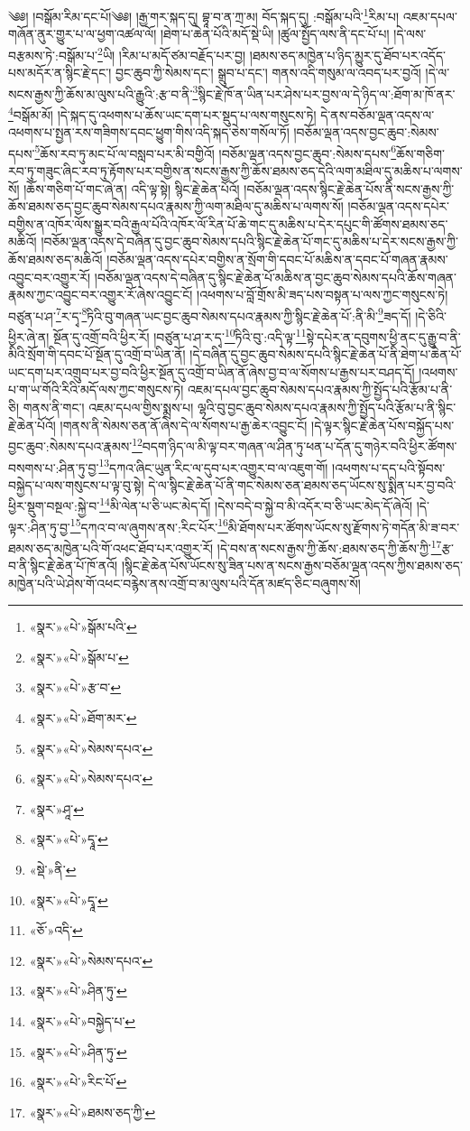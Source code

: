 ༄༅། །བསྒོམ་རིམ་དང་པོ།༄༅། །རྒྱ་གར་སྐད་དུ། བྷཱ་བ་ན་ཀྲ་མ། བོད་སྐད་དུ། :བསྒོམ་པའི་\footnote{«སྣར་»«པེ་»སྒོམ་པའི་}རིམ་པ། འཇམ་དཔལ་གཞོན་ནུར་གྱུར་པ་ལ་ཕྱག་འཚལ་ལོ། །ཐེག་པ་ཆེན་པོའི་མདོ་སྡེ་ཡི། །ཚུལ་སྤྱོད་ལས་ནི་དང་པོ་པ། །དེ་ལས་བརྩམས་ཏེ་:བསྒོམ་པ་\footnote{«སྣར་»«པེ་»སྒོམ་པ་}ཡི། །རིམ་པ་མདོ་ཙམ་བརྗོད་པར་བྱ། །ཐམས་ཅད་མཁྱེན་པ་ཉིད་མྱུར་དུ་ཐོབ་པར་འདོད་པས་མདོར་ན་སྙིང་རྗེ་དང་། བྱང་ཆུབ་ཀྱི་སེམས་དང་། སྒྲུབ་པ་དང་། གནས་འདི་གསུམ་ལ་འབད་པར་བྱའོ། །དེ་ལ་སངས་རྒྱས་ཀྱི་ཆོས་མ་ལུས་པའི་རྒྱུའི་:རྩ་བ་ནི་\footnote{«སྣར་»«པེ་»རྩ་བ་}སྙིང་རྗེ་ཁོ་ན་ཡིན་པར་ཤེས་པར་བྱས་ལ་དེ་ཉིད་ལ་:ཐོག་མ་ཁོ་ནར་\footnote{«སྣར་»«པེ་»ཐོག་མར་}བསྒོམ་མོ། །དེ་སྐད་དུ་འཕགས་པ་ཆོས་ཡང་དག་པར་སྡུད་པ་ལས་གསུངས་ཏེ། དེ་ནས་བཅོམ་ལྡན་འདས་ལ་འཕགས་པ་སྤྱན་རས་གཟིགས་དབང་ཕྱུག་གིས་འདི་སྐད་ཅེས་གསོལ་ཏོ། །བཅོམ་ལྡན་འདས་བྱང་ཆུབ་:སེམས་དཔས་\footnote{«སྣར་»«པེ་»སེམས་དཔའ་}ཆོས་རབ་ཏུ་མང་པོ་ལ་བསླབ་པར་མི་བགྱིའོ། །བཅོམ་ལྡན་འདས་བྱང་ཆུབ་:སེམས་དཔས་\footnote{«སྣར་»«པེ་»སེམས་དཔའ་}ཆོས་གཅིག་རབ་ཏུ་གཟུང་ཞིང་རབ་ཏུ་རྟོགས་པར་བགྱིས་ན་སངས་རྒྱས་ཀྱི་ཆོས་ཐམས་ཅད་དེའི་ལག་མཐིལ་དུ་མཆིས་པ་ལགས་སོ། །ཆོས་གཅིག་པོ་གང་ཞེ་ན། འདི་ལྟ་སྟེ། སྙིང་རྗེ་ཆེན་པོའོ། །བཅོམ་ལྡན་འདས་སྙིང་རྗེ་ཆེན་པོས་ནི་སངས་རྒྱས་ཀྱི་ཆོས་ཐམས་ཅད་བྱང་ཆུབ་སེམས་དཔའ་རྣམས་ཀྱི་ལག་མཐིལ་དུ་མཆིས་པ་ལགས་སོ། །བཅོམ་ལྡན་འདས་དཔེར་བགྱིས་ན་འཁོར་ལོས་སྒྱུར་བའི་རྒྱལ་པོའི་འཁོར་ལོ་རིན་པོ་ཆེ་གང་དུ་མཆིས་པ་དེར་དཔུང་གི་ཚོགས་ཐམས་ཅད་མཆིའོ། །བཅོམ་ལྡན་འདས་དེ་བཞིན་དུ་བྱང་ཆུབ་སེམས་དཔའི་སྙིང་རྗེ་ཆེན་པོ་གང་དུ་མཆིས་པ་དེར་སངས་རྒྱས་ཀྱི་ཆོས་ཐམས་ཅད་མཆིའོ། །བཅོམ་ལྡན་འདས་དཔེར་བགྱིས་ན་སྲོག་གི་དབང་པོ་མཆིས་ན་དབང་པོ་གཞན་རྣམས་འབྱུང་བར་འགྱུར་རོ། །བཅོམ་ལྡན་འདས་དེ་བཞིན་དུ་སྙིང་རྗེ་ཆེན་པོ་མཆིས་ན་བྱང་ཆུབ་སེམས་དཔའི་ཆོས་གཞན་རྣམས་ཀྱང་འབྱུང་བར་འགྱུར་རོ་ཞེས་འབྱུང་ངོ། །འཕགས་པ་བློ་གྲོས་མི་ཟད་པས་བསྟན་པ་ལས་ཀྱང་གསུངས་ཏེ། བཙུན་པ་ཤ་\footnote{«སྣར་»ཤཱ་}ར་དྭ་\footnote{«སྣར་»«པེ་»དྭཱ་}ཏིའི་བུ་གཞན་ཡང་བྱང་ཆུབ་སེམས་དཔའ་རྣམས་ཀྱི་སྙིང་རྗེ་ཆེན་པོ་:ནི་མི་\footnote{«སྡེ་»ནི་}ཟད་དོ། །དེ་ཅིའི་ཕྱིར་ཞེ་ན། སྔོན་དུ་འགྲོ་བའི་ཕྱིར་རོ། །བཙུན་པ་ཤ་ར་དྭ་\footnote{«སྣར་»«པེ་»དྭཱ་}ཏིའི་བུ་:འདི་ལྟ་\footnote{«ཅོ་»འདི་}སྟེ་དཔེར་ན་དབུགས་ཕྱི་ནང་དུ་རྒྱུ་བ་ནི་མིའི་སྲོག་གི་དབང་པོ་སྔོན་དུ་འགྲོ་བ་ཡིན་ནོ། །དེ་བཞིན་དུ་བྱང་ཆུབ་སེམས་དཔའི་སྙིང་རྗེ་ཆེན་པོ་ནི་ཐེག་པ་ཆེན་པོ་ཡང་དག་པར་འགྲུབ་པར་བྱ་བའི་ཕྱིར་སྔོན་དུ་འགྲོ་བ་ཡིན་ནོ་ཞེས་བྱ་བ་ལ་སོགས་པ་རྒྱས་པར་བཤད་དོ། །འཕགས་པ་ག་ཡ་གོའི་རིའི་མདོ་ལས་ཀྱང་གསུངས་ཏེ། འཇམ་དཔལ་བྱང་ཆུབ་སེམས་དཔའ་རྣམས་ཀྱི་སྤྱོད་པའི་རྩོམ་པ་ནི་ཅི། གནས་ནི་གང་། འཇམ་དཔལ་གྱིས་སྨྲས་པ། ལྷའི་བུ་བྱང་ཆུབ་སེམས་དཔའ་རྣམས་ཀྱི་སྤྱོད་པའི་རྩོམ་པ་ནི་སྙིང་རྗེ་ཆེན་པོའོ། །གནས་ནི་སེམས་ཅན་ནོ་ཞེས་དེ་ལ་སོགས་པ་རྒྱ་ཆེར་འབྱུང་ངོ། །དེ་ལྟར་སྙིང་རྗེ་ཆེན་པོས་བསྐྱོད་པས་བྱང་ཆུབ་:སེམས་དཔའ་རྣམས་\footnote{«སྣར་»«པེ་»སེམས་དཔའ་}བདག་ཉིད་ལ་མི་ལྟ་བར་གཞན་ལ་ཤིན་ཏུ་ཕན་པ་དོན་དུ་གཉེར་བའི་ཕྱིར་ཚོགས་བསགས་པ་:ཤིན་ཏུ་བྱ་\footnote{«སྣར་»«པེ་»ཤིན་ཏུ་}དཀའ་ཞིང་ཡུན་རིང་ལ་དུབ་པར་འགྱུར་བ་ལ་འཇུག་གོ། །འཕགས་པ་དད་པའི་སྟོབས་བསྐྱེད་པ་ལས་གསུངས་པ་ལྟ་བུ་སྟེ། དེ་ལ་སྙིང་རྗེ་ཆེན་པོ་ནི་གང་སེམས་ཅན་ཐམས་ཅད་ཡོངས་སུ་སྨིན་པར་བྱ་བའི་ཕྱིར་སྡུག་བསྔལ་:སྐྱེ་བ་\footnote{«སྣར་»«པེ་»བསྐྱེད་པ་}མི་ལེན་པ་ཅི་ཡང་མེད་དོ། །དེས་བདེ་བ་སྐྱེ་བ་མི་འདོར་བ་ཅི་ཡང་མེད་དོ་ཞེའོ། །དེ་ལྟར་:ཤིན་ཏུ་བྱ་\footnote{«སྣར་»«པེ་»ཤིན་ཏུ་}དཀའ་བ་ལ་ཞུགས་ནས་:རིང་པོར་\footnote{«སྣར་»«པེ་»རིང་པོ་}མི་ཐོགས་པར་ཚོགས་ཡོངས་སུ་རྫོགས་ཏེ་གདོན་མི་ཟ་བར་ཐམས་ཅད་མཁྱེན་པའི་གོ་འཕང་ཐོབ་པར་འགྱུར་རོ། །དེ་བས་ན་སངས་རྒྱས་ཀྱི་ཆོས་:ཐམས་ཅད་ཀྱི་ཆོས་ཀྱི་\footnote{«སྣར་»«པེ་»ཐམས་ཅད་ཀྱི་}རྩ་བ་ནི་སྙིང་རྗེ་ཆེན་པོ་ཁོ་ནའོ། །སྙིང་རྗེ་ཆེན་པོས་ཡོངས་སུ་ཟིན་པས་ན་སངས་རྒྱས་བཅོམ་ལྡན་འདས་ཀྱིས་ཐམས་ཅད་མཁྱེན་པའི་ཡེ་ཤེས་གོ་འཕང་བརྙེས་ནས་འགྲོ་བ་མ་ལུས་པའི་དོན་མཛད་ཅིང་བཞུགས་སོ། 